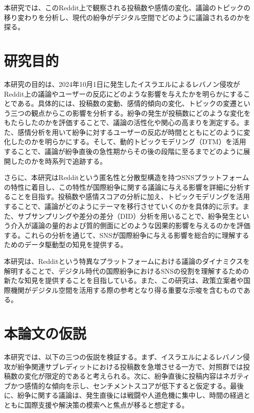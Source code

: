 \documentclass[11pt, a4j]{jreport}
\begin{document}
    本研究では、このReddit上で観察される投稿数や感情の変化、議論のトピックの移り変わりを分析し、現代の紛争がデジタル空間でどのように議論されるのかを探る。

    \section{研究目的}
    本研究の目的は、2024年10月1日に発生したイスラエルによるレバノン侵攻がReddit上の議論やユーザーの反応にどのような影響を与えたかを明らかにすることである。具体的には、投稿数の変動、感情的傾向の変化、トピックの変遷という三つの観点からこの影響を分析する。紛争の発生が投稿数にどのような変化をもたらしたのかを評価することで、議論の活性化や関心の高まりを測定する。また、感情分析を用いて紛争に対するユーザーの反応が時間とともにどのように変化したのかを明らかにする。そして、動的トピックモデリング（DTM）を活用することで、議論が紛争直後の急性期からその後の段階に至るまでどのように展開したのかを時系列で追跡する。
    
    さらに、本研究はRedditという匿名性と分散型構造を持つSNSプラットフォームの特性に着目し、この特性が国際紛争に関する議論に与える影響を詳細に分析することを目指す。投稿数や感情スコアの分析に加え、トピックモデリングを活用することで、議論がどのようにテーマを移行させていくのかを具体的に示す。また、サブサンプリングや差分の差分（DID）分析を用いることで、紛争発生という介入が議論の量的および質的側面にどのような因果的影響を与えるのかを評価する。これらの分析を通じて、SNSが国際紛争に与える影響を総合的に理解するためのデータ駆動型の知見を提供する。
    
    本研究は、Redditという特異なプラットフォームにおける議論のダイナミクスを解明することで、デジタル時代の国際紛争におけるSNSの役割を理解するための新たな知見を提供することを目指している。また、この研究は、政策立案者や国際機関がデジタル空間を活用する際の参考となり得る重要な示唆を含むものである。

    \section{本論文の仮説}
    本研究では、以下の三つの仮説を検証する。まず、イスラエルによるレバノン侵攻が紛争関連サブレディットにおける投稿数を急増させる一方で、対照群では投稿数の変化が限定的であると考えられる。次に、紛争直後に投稿内容はネガティブかつ感情的な傾向を示し、センチメントスコアが低下すると仮定する。最後に、紛争に関する議論は、発生直後には戦闘や人道危機に集中し、時間の経過とともに国際支援や解決策の模索へと焦点が移ると想定する。
    
\end{document}
